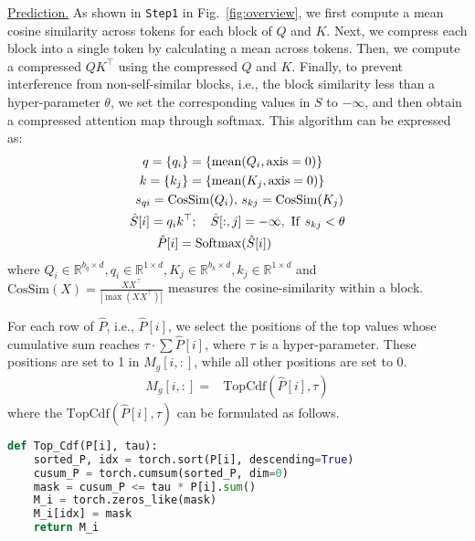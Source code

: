 \noindent \underline{Prediction.} 
As shown in \texttt{Step1} in Fig.~\ref{fig:overview}, we first compute a mean cosine similarity across tokens for each block of $Q$ and $K$. Next, we compress each block into a single token by calculating a mean across tokens. Then, we compute a compressed $QK^\top$ using the compressed \(Q\) and \(K\). Finally, to prevent interference from non-self-similar blocks, i.e., the block similarity less than a hyper-parameter $\theta$, we set the corresponding values in \(S\) to \(-\infty\), and then obtain a compressed attention map through softmax. This algorithm can be expressed as:
{
\begin{align*}
    q = \{q_i\} = \{\mathrm{mean}& (Q_i, \mathrm{axis}=0)\} \notag \\
    k = \{k_j\} = \{\mathrm{mean}& (K_j, \mathrm{axis}=0)\}   \\ 
    s_{qi} = \mathrm{CosSim}(Q_i),~ &s_{kj} = \mathrm{CosSim}(K_j)\\
    \hat S[i] = q_ik^\top ; ~~~ \hat S[:,j] &= - \infty, ~\mathrm{If}~ s_{kj} < \theta \\
    \hat P[i] = \mathrm{Softmax}&(\hat S[i])
\end{align*}
}
where $Q_i \in \mathbb{R}^{b_q\times d}, q_i \in \mathbb{R}^{1\times d}, K_j \in \mathbb{R}^{b_k\times d},  k_j \in \mathbb{R}^{1\times d}$ and $\mathrm{CosSim}(X) = \frac{XX^\top}{|\max(XX^\top)|}$ measures the cosine-similarity within a block.

For each row of $\hat P$, i.e., $\hat P[i]$, we select the positions of the top values whose cumulative sum reaches \(\tau \cdot \sum \hat P[i]\), where \(\tau\) is a hyper-parameter. These positions are set to 1 in \(M_{g}[i,:]\), while all other positions are set to 0.
\begin{align} 
    M_{g}[i,:]  = &\mathrm{TopCdf}(\hat P[i], \tau)   
\end{align}
where the $\mathrm{TopCdf}(\hat P[i], \tau)$ can be formulated as follows.
\begin{lstlisting}[language=python]
def Top_Cdf(P[i], tau):
    sorted_P, idx = torch.sort(P[i], descending=True)
    cusum_P = torch.cumsum(sorted_P, dim=0)
    mask = cusum_P <= tau * P[i].sum()
    M_i = torch.zeros_like(mask)
    M_i[idx] = mask
    return M_i
\end{lstlisting}


